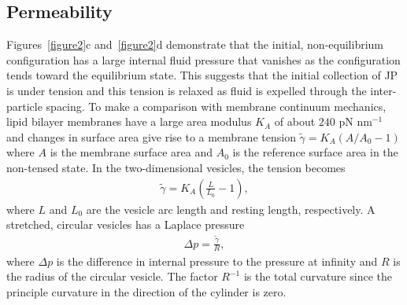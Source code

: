 \documentclass[lineno]{jfm}
\begin{document}
\subsection{Permeability}
Figures~\ref{figure2}c and~\ref{figure2}d demonstrate that the initial, non-equilibrium configuration has a large internal fluid pressure
that vanishes as the configuration tends toward the equilibrium state.  
This suggests that the initial collection of JP is under tension and
this tension is relaxed as fluid is expelled through the inter-particle
spacing. To make a comparison with membrane continuum mechanics, lipid
bilayer membranes have a large area modulus $K_A$ of about $240$ pN
nm$^{-1}$ \cite{NAGLE} and changes in surface area give rise to a
membrane tension $\tilde \gamma = K_A(A/A_0 - 1)$ where $A$ is the
membrane surface area and $A_0$ is the reference surface area in the
non-tensed state. In the two-dimensional vesicles, the tension becomes
\begin{align}
\label{eq:stretch}
\tilde \gamma = K_A\left(\frac{L}{L_0} - 1 \right),
\end{align}
where $L$ and $L_0$ are the vesicle arc length and resting length,
respectively. A stretched, circular vesicles has a Laplace pressure 
\begin{align}
\label{eq:LaplacePressure}
\Delta p = \frac{\tilde \gamma}{R},
\end{align}
where $\Delta p$ is the difference in internal pressure to the pressure
at infinity and $R$ is the radius of the circular vesicle. The factor
$R^{-1}$ is the total curvature since the principle curvature in the
direction of the cylinder is zero.
\end{document}
